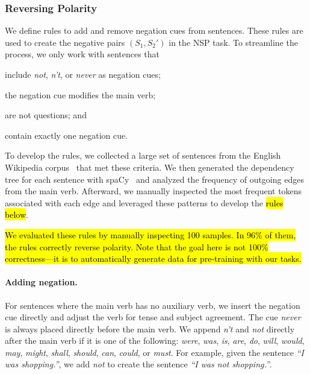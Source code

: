 \subsubsection{Reversing Polarity}
\label{sec:reversing}

We define rules to add and remove negation cues from sentences.
These rules are used to create the negative pairs $(S_1, S_2')$ in the NSP task.
To streamline the process,
we only work with sentences that
\begin{compactitem}
    \item include \emph{not}, \emph{n't}, or \emph{never} as negation cues;
    \item the negation cue modifies the main verb;
    \item are not questions; and
    \item contain exactly one negation cue.
\end{compactitem}
To develop the rules, 
we collected a large set of sentences from the English Wikipedia corpus~\cite{wikidump} that met these criteria.
We then generated the dependency tree for each sentence with spaCy~\cite{spacy2, honnibal-johnson-2015-improved} 
and analyzed the frequency of outgoing edges from the main verb. 
Afterward, we manually inspected the most frequent tokens associated with each edge 
and leveraged these patterns to develop the \hl{rules below}.

\hl{
    We evaluated these rules by manually inspecting 100 samples.
    In 96\% of them, 
    the rules correctly reverse polarity. 
    Note that the goal here is not 100\% correctness---it is to automatically generate data for pre-training with our tasks.
} 

\paragraph{Adding negation.}
For sentences where the main verb has no auxiliary verb,
we insert the negation cue directly and adjust the verb for tense and subject agreement. 
The cue \emph{never} is always placed directly before the main verb.
We append \emph{n't} and \emph{not} directly after the main verb if it is one of the following:
\emph{were}, \emph{was}, \emph{is}, \emph{are}, \emph{do}, \emph{will}, \emph{would}, \emph{may}, \emph{might}, \emph{shall}, \emph{should}, \emph{can}, \emph{could}, or \emph{must}.
For example, given the sentence \emph{``I was shopping.''},
we add \emph{not} to create the sentence \emph{``I was not shopping.''}.

